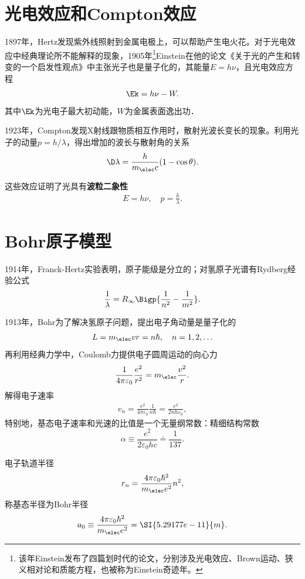 \section{光电效应和Compton效应}
1897年，Hertz发现紫外线照射到金属电极上，可以帮助产生电火花。对于光电效应中经典理论所不能解释的现象，1905年\footnote{该年Einstein发布了四篇划时代的论文，分别涉及光电效应、Brown运动、狭义相对论和质能方程，也被称为Einstein奇迹年。}Einstein在他的论文《关于光的产生和转变的一个启发性观点》中主张光子也是量子化的，其能量$E=h\nu$，且光电效应方程
\begin{align}
	\Ek=h\nu-W.
\end{align}
其中$\Ek$为光电子最大初动能，$W$为金属表面逸出功．

1923年，Compton发现X射线跟物质相互作用时，散射光波长变长的现象。利用光子的动量$p=h/\lambda$，得出增加的波长与散射角的关系
\begin{align}
	\D\lambda=\frac h{m_\elec c}(1-\cos\theta).
\end{align}

这些效应证明了光具有\textbf{波粒二象性}
\begin{align}
	E=h\nu,\quad p=\frac h\lambda.
\end{align}
\section{Bohr原子模型}
1914年，Franck-Hertz实验表明，原子能级是分立的；对氢原子光谱有Rydberg经验公式
\begin{align}
	\frac1\lambda=R_\infty\Bigp{\frac1{n^2}-\frac1{m^2}}.
\end{align}

1913年，Bohr为了解决氢原子问题，提出电子角动量是量子化的
\begin{align}
	L=m_\elec vr=n\hbar,\quad n=1,2,\ldots
\end{align}
再利用经典力学中，Coulomb力提供电子圆周运动的向心力
\[
	\frac1{4\pi\varepsilon_0}\frac{e^2}{r^2}=m_\elec\frac{v^2}r.
\]
解得电子速率
\begin{align}
	v_n=\frac{e^2}{4\pi\varepsilon_0}\frac{1}{n\hbar}=\frac{e^2}{2nh\varepsilon_0},
\end{align}
特别地，基态电子速率和光速的比值是一个无量纲常数：精细结构常数
\[
	\alpha\equiv\frac{e^2}{2\varepsilon_0 hc}\doteq\frac1{137}.
\]

电子轨道半径
\begin{align}
	r_n=\frac{4\pi\varepsilon_0\hbar^2}{m_\elec e^2}n^2,
\end{align}
称基态半径为Bohr半径
\[
a_0\equiv\frac{4\pi\varepsilon_0\hbar^2}{m_\elec e^2}=\SI{5.29177e-11}{m}.
\]

